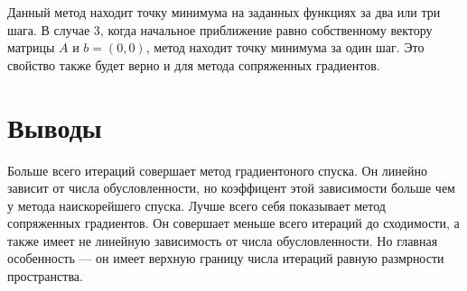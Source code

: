 \documentclass[english]{article}
\begin{document}
Данный метод находит точку минимума на заданных функциях за два или
три шага. В случае 3, когда начальное приближение равно собственному
вектору матрицы \(A\) и \(b = (0, 0)\), метод находит точку минимума
за один шаг. Это свойство также будет верно и для метода сопряженных
градиентов.

\section{Выводы}
Больше всего итераций совершает метод градиентоного спуска. Он линейно
зависит от числа обусловленности, но коэффицент этой зависимости
больше чем у метода наискорейшего спуска. Лучше всего себя показывает
метод сопряженных градиентов. Он совершает меньше всего итераций до
сходимости, а также имеет не линейную зависимость от числа
обусловленности. Но главная особенность --- он имеет верхную границу
числа итераций равную размрности пространства.
\end{document}
